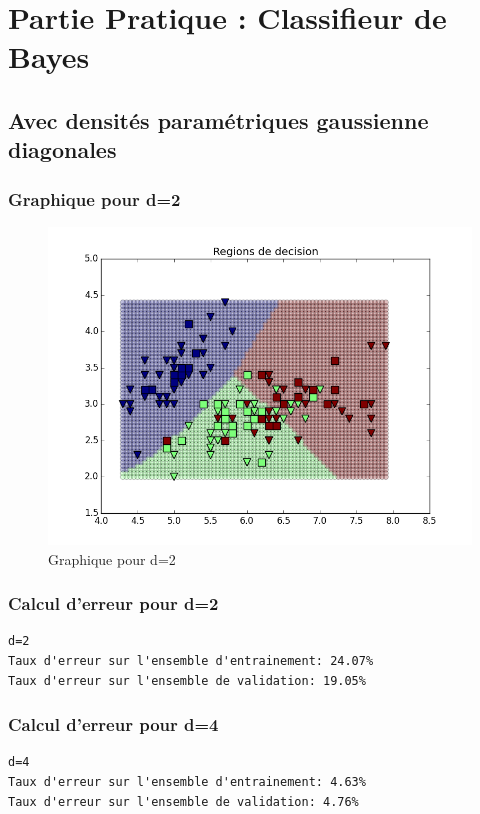 \documentclass[a4paper,10pt]{article}
\begin{document}
\section{Partie Pratique : Classifieur de Bayes}

\subsection{Avec densités paramétriques gaussienne diagonales}

\subsubsection{Graphique pour d=2}
\begin{figure}[H]
	\includegraphics[width=12cm]{images/bayes_gaussienne.png} 
	\centering
	\caption{Graphique pour d=2}
	\label{fig:comp}
\end{figure}

\subsubsection{Calcul d'erreur pour d=2}
\begin{verbatim}
d=2
Taux d'erreur sur l'ensemble d'entrainement: 24.07%
Taux d'erreur sur l'ensemble de validation: 19.05%	
\end{verbatim}

\subsubsection{Calcul d'erreur pour d=4}

\begin{verbatim}
d=4
Taux d'erreur sur l'ensemble d'entrainement: 4.63%
Taux d'erreur sur l'ensemble de validation: 4.76%
\end{verbatim}
\end{document}

